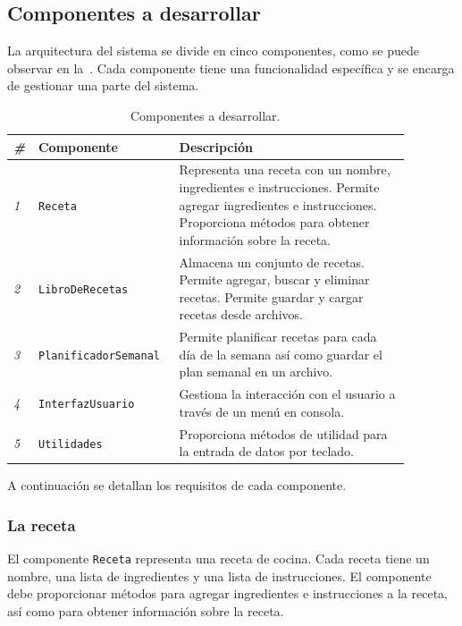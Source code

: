 \documentclass[
    a4paper, %
    12pt, %
]{CSSullivanBusinessReport}
\begin{document}
\subsection{Componentes a desarrollar}

La arquitectura del sistema se divide en cinco componentes, como se puede observar en la~. Cada componente tiene una funcionalidad específica y se encarga de gestionar una parte del sistema.

\begin{table} %
    \caption{Componentes a desarrollar.}\label{tab:componentes-desarrollar}
    \begin{tabular}{C{0.03\linewidth} L{0.3\linewidth} L{0.55\linewidth}}
        \toprule
        \textit{\#} & \textbf{Componente} & \textbf{Descripción} \\
        \midrule
        \textit{1} & \texttt{Receta} & Representa una receta con un nombre, ingredientes e instrucciones. Permite agregar ingredientes e instrucciones. Proporciona métodos para obtener información sobre la receta.\\
        \textit{2} & \texttt{LibroDeRecetas} & Almacena un conjunto de recetas. Permite agregar, buscar y eliminar recetas. Permite guardar y cargar recetas desde archivos.\\
        \textit{3} & \texttt{PlanificadorSemanal} & Permite planificar recetas para cada día de la semana así como guardar el plan semanal en un archivo.\\
        \textit{4} & \texttt{InterfazUsuario} & Gestiona la interacción con el usuario a través de un menú en consola.\\
        \textit{5} & \texttt{Utilidades} & Proporciona métodos de utilidad para la entrada de datos por teclado.\\
        \bottomrule
    \end{tabular}
\end{table}

A continuación se detallan los requisitos de cada componente.

\subsubsection{La receta}\label{sec:receta}

El componente \texttt{Receta} representa una receta de cocina. Cada receta tiene un nombre, una lista de ingredientes y una lista de instrucciones. El componente debe proporcionar métodos para agregar ingredientes e instrucciones a la receta, así como para obtener información sobre la receta.
\end{document}
